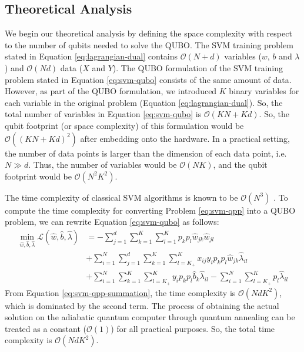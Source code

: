 \documentclass[12pt]{article}
\numberwithin{equation}{section}
\begin{document}
\subsection{Theoretical Analysis}
\label{sub:svm-analysis}
We begin our theoretical analysis by defining the space complexity with respect to the number of qubits needed to solve the QUBO.
The SVM training problem stated in Equation \ref{eq:lagrangian-dual} contains $\mathcal{O}(N + d)$ variables ($w$, $b$ and $\lambda$) and $\mathcal{O}(Nd)$ data ($X$ and $Y$).
The QUBO formulation of the SVM training problem stated in Equation \ref{eq:svm-qubo} consists of the same amount of data.
However, as part of the QUBO formulation, we introduced $K$ binary variables for each variable in the original problem (Equation \ref{eq:lagrangian-dual}).
So, the total number of variables in Equation \ref{eq:svm-qubo} is $\mathcal{O}(KN + Kd)$.
So, the qubit footprint (or space complexity) of this formulation would be $\mathcal{O}((KN + Kd)^2)$ after embedding onto the hardware.
In a practical setting, the number of data points is larger than the dimension of each data point, i.e. $N \gg d$.
Thus, the number of variables would be $\mathcal{O}(NK)$, and the qubit footprint would be $\mathcal{O}(N^2 K^2)$.

The time complexity of classical SVM algorithms is known to be $\mathcal{O}(N^3)$ \cite{bottou2007support}.
To compute the time complexity for converting Problem \ref{eq:svm-qpp} into a QUBO problem, we can rewrite Equation \ref{eq:svm-qubo} as follows:
\begin{align}
    \min_{\hat{w}, \hat{b}, \hat{\lambda}} \mathcal{L}(\hat{w}, \hat{b}, \hat{\lambda}) &= -\sum_{j=1}^d \sum_{k=1}^{K} \sum_{l=1}^{K} p_k p_l \hat{w}_{jk} \hat{w}_{jl} \nonumber \\
    & + \sum_{i=1}^{N} \sum_{j=1}^{d} \sum_{k=1}^{K} \sum_{l=K_+}^{K} x_{ij} y_i p_k p_l \hat{w}_{jk} \hat{\lambda}_{il} \nonumber \\
    & + \sum_{i=1}^{N} \sum_{k=1}^{K} \sum_{l=K_+}^{K} y_i p_k p_l \hat{b}_k \hat{\lambda}_{il}
     - \sum_{i=1}^{N} \sum_{l=K_+}^K p_l \hat{\lambda}_{il} \label{eq:svm-qpp-summation}
\end{align}
From Equation \ref{eq:svm-qpp-summation}, the time complexity is $\mathcal{O}(NdK^2)$, which is dominated by the second term.
The process of obtaining the actual solution on the adiabatic quantum computer through quantum annealing can be treated as a constant ($\mathcal{O}(1)$) for all practical purposes.
So, the total time complexity is $\mathcal{O}(N d K^2)$.
\end{document}

